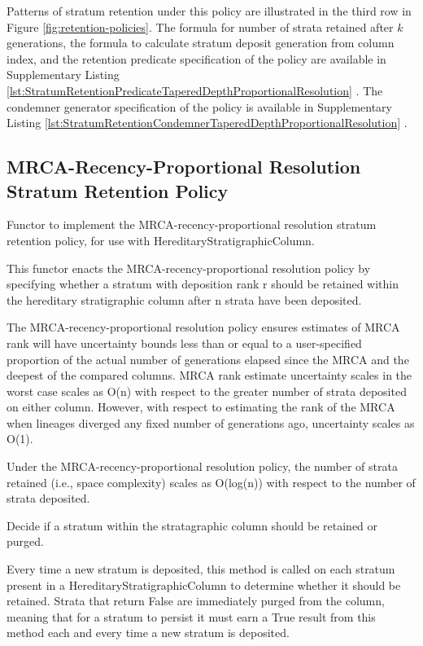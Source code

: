 Patterns of stratum retention under this policy are illustrated in the third row in Figure \ref{fig:retention-policies}.
The formula for number of strata retained after $k$ generations, the formula to calculate stratum deposit generation from column index, and the retention predicate specification of the policy are available in Supplementary Listing \ref{lst:StratumRetentionPredicateTaperedDepthProportionalResolution} \citep{moreno2022hstratconceptsupplement}.
The condemner generator specification of the policy is available in Supplementary Listing \ref{lst:StratumRetentionCondemnerTaperedDepthProportionalResolution} \citep{moreno2022hstratconceptsupplement}.

\subsection{MRCA-Recency-Proportional Resolution Stratum Retention Policy}

Functor to implement the MRCA-recency-proportional resolution stratum
retention policy, for use with HereditaryStratigraphicColumn.

This functor enacts the MRCA-recency-proportional resolution policy by
specifying whether a stratum with deposition rank r should be retained
within the hereditary stratigraphic column after n strata have been
deposited.

The MRCA-recency-proportional resolution policy ensures estimates of MRCA
rank will have uncertainty bounds less than or equal to a user-specified
proportion of the actual number of generations elapsed since the MRCA and
the deepest of the compared columns. MRCA rank estimate uncertainty scales
in the worst case scales as O(n) with respect to the greater number of
strata deposited on either column. However, with respect to estimating the rank of the MRCA when lineages diverged any fixed number of generations ago,
uncertainty scales as O(1).

Under the MRCA-recency-proportional resolution policy, the number of strata
retained (i.e., space complexity) scales as O(log(n)) with respect to the
number of strata deposited.

Decide if a stratum within the stratagraphic column should be
retained or purged.

Every time a new stratum is deposited, this method is called on each
stratum present in a HereditaryStratigraphicColumn to determine whether
it should be retained. Strata that return False are immediately purged
from the column, meaning that for a stratum to persist it must earn a
True result from this method each and every time a new stratum is
deposited.

